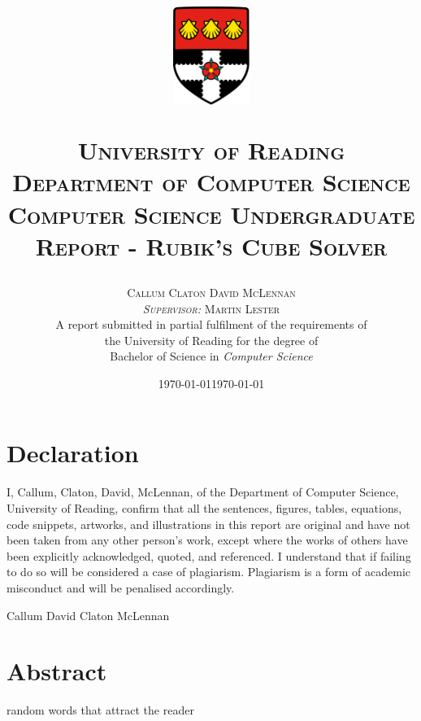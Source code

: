 \documentclass[12pt]{report} %
\title{
    \centerline{\includegraphics[width = 25mm]{Images/Uni.png}}
    \vspace{1.5cm}
    \textsc{\LARGE University of Reading}\\[0.25cm]
    \textsc{\Large Department of Computer Science}\\[1cm]
    \textsc{\large Computer Science Undergraduate Report - }
    \textsc{\large Rubik's Cube Solver}\\[0.75cm]
}
\author{
    \large
    \textsc{Callum Claton David McLennan}\\[0.25cm]
    \textsc{\normalsize \textit{Supervisor:} Martin Lester}\\[1cm]
    A report submitted in partial fulfilment of the requirements of\\the University of Reading for the degree of\\
    Bachelor of Science in \textit{Computer Science}
    \date{\today}
}
\begin{document}
\maketitle
\newpage
\section*{Declaration}
\vspace{1cm}
I, Callum, Claton, David, McLennan, of the Department of Computer Science, University of Reading, confirm that all the sentences, figures, tables, equations, code snippets, artworks, and illustrations in this report are original and have not been taken from any other person’s work, except where the works of others have been explicitly acknowledged, quoted, and referenced. I understand that if failing to do so will be considered a case of plagiarism. Plagiarism is a form of academic misconduct and will be penalised accordingly.
\vspace{1cm}
\begin{flushright}Callum David Claton McLennan \\ \date{\today}\end{flushright}
\newpage
\section*{Abstract}
random words that attract the reader


\tableofcontents

\newpage
\setcounter{page}{1}

\end{document}
